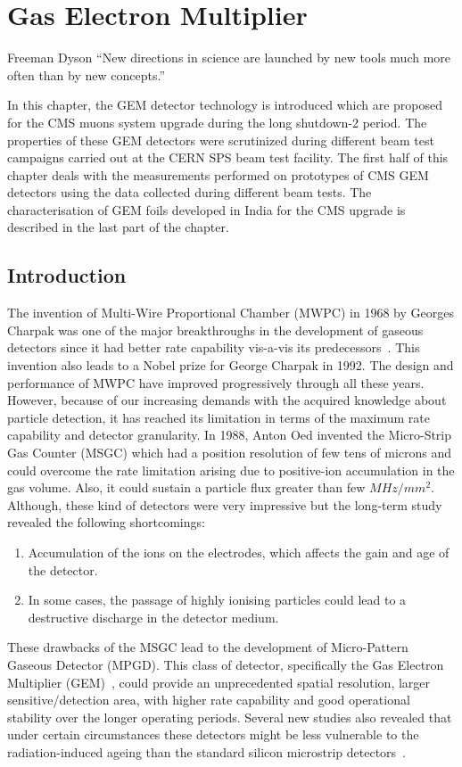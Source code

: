 \chapter{Gas Electron Multiplier} %
\label{cha:gas_electron_multiplier}
\begin{chapquote}
{Freeman Dyson}
``New directions in science are launched by new tools much more often than by new concepts.''
\end{chapquote}

In this chapter, the GEM detector technology is introduced which are proposed for the CMS muons system upgrade during the long shutdown-2 period. 
The properties of these GEM detectors were scrutinized during different beam test campaigns carried out at the CERN SPS beam test facility.
The first half of this chapter deals with the measurements performed on prototypes of CMS GEM detectors using the data collected during  different beam tests. 
The characterisation of GEM foils developed in India for the CMS upgrade is described in the last part of the chapter.

\section{Introduction} %
\label{sec:introduction}
The invention of Multi-Wire Proportional Chamber (MWPC) in 1968 by Georges Charpak was one of the major breakthroughs in the development of gaseous detectors since it had better rate capability vis-a-vis its predecessors~\cite{Charpak1968}. 
This invention also leads to a Nobel prize for George Charpak in 1992. 
The design and performance of MWPC have improved progressively through all these years.
However, because of our increasing demands with the acquired knowledge about particle detection, it has reached its limitation in terms of the maximum rate capability and detector granularity.
In 1988, Anton Oed invented the Micro-Strip Gas Counter (MSGC) which had a position resolution of few tens of microns and could overcome the rate limitation arising due to positive-ion accumulation in the gas volume. 
Also, it could sustain a particle flux greater than few $MHz/mm^2$. Although, these kind of detectors were very impressive but the long-term study revealed the following shortcomings:
\begin{enumerate}
	\item Accumulation of the ions on the electrodes, which affects the gain and age of the detector.
	\item In some cases, the passage of highly ionising particles could lead to a destructive discharge in the detector medium.
\end{enumerate}
These drawbacks of the MSGC lead to the development of Micro-Pattern Gaseous Detector (MPGD).
This class of detector, specifically the Gas Electron Multiplier (GEM)~\cite{Sauli1997,Sauli1999,detector:1732870}, could provide an unprecedented spatial resolution, larger sensitive/detection area, with higher rate capability and good operational stability over the longer operating periods.
Several new studies also revealed that under certain circumstances these detectors might be less vulnerable to the radiation-induced ageing than the standard silicon microstrip detectors~\cite{TITOV2004,Titov2002}.

